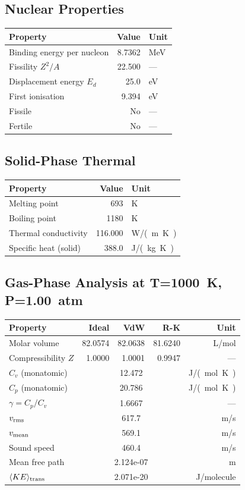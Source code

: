 \documentclass[11pt,a4paper]{article}
\begin{document}
\subsection{Nuclear Properties}
\begin{tabular}{lrl}
  \toprule
  Property & Value & Unit \\
  \midrule
  Binding energy per nucleon & 8.7362 & \si{MeV} \\
  Fissility $Z^2/A$ & 22.500 & --- \\
  Displacement energy $E_d$ & 25.0 & \si{eV} \\
  First ionisation & 9.394 & \si{eV} \\
  Fissile & No & --- \\
  Fertile & No & --- \\
  \bottomrule
\end{tabular}

\subsection{Solid-Phase Thermal}
\begin{tabular}{lrl}
  \toprule
  Property & Value & Unit \\
  \midrule
  Melting point & 693 & \si{K} \\
  Boiling point & 1180 & \si{K} \\
  Thermal conductivity & 116.000 & \si{W/(m.K)} \\
  Specific heat (solid) & 388.0 & \si{J/(kg.K)} \\
  \bottomrule
\end{tabular}

\subsection{Gas-Phase Analysis at T=\SI{1000}{K}, P=\SI{1.00}{atm}}
\begin{tabular}{lrrrr}
  \toprule
  Property & Ideal & VdW & R-K & Unit \\
  \midrule
  Molar volume & 82.0574 & 82.0638 & 81.6240 & \si{L/mol} \\
  Compressibility $Z$ & 1.0000 & 1.0001 & 0.9947 & --- \\
  \midrule
  $C_v$ (monatomic) & \multicolumn{3}{c}{12.472} & \si{J/(mol.K)} \\
  $C_p$ (monatomic) & \multicolumn{3}{c}{20.786} & \si{J/(mol.K)} \\
  $\gamma = C_p/C_v$ & \multicolumn{3}{c}{1.6667} & --- \\
  $v_{\rm rms}$ & \multicolumn{3}{c}{617.7} & \si{m/s} \\
  $v_{\rm mean}$ & \multicolumn{3}{c}{569.1} & \si{m/s} \\
  Sound speed & \multicolumn{3}{c}{460.4} & \si{m/s} \\
  Mean free path & \multicolumn{3}{c}{2.124e-07} & \si{m} \\
  $\langle KE \rangle_{\rm trans}$ & \multicolumn{3}{c}{2.071e-20} & \si{J/molecule} \\
  \bottomrule
\end{tabular}
\end{document}
